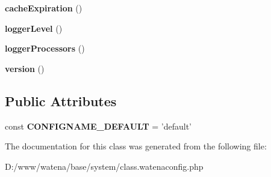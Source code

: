 \begin{DoxyCompactItemize}
\item 
\hypertarget{class_watena_config_ac379b7e4341f2423010cd42e60494518}{{\bfseries cache\-Expiration} ()}\label{class_watena_config_ac379b7e4341f2423010cd42e60494518}

\item 
\hypertarget{class_watena_config_af65f55ea3f405005e08ae63f1853b7a9}{{\bfseries logger\-Level} ()}\label{class_watena_config_af65f55ea3f405005e08ae63f1853b7a9}

\item 
\hypertarget{class_watena_config_a5b7beca01d94377ae27b1317e1e1f192}{{\bfseries logger\-Processors} ()}\label{class_watena_config_a5b7beca01d94377ae27b1317e1e1f192}

\item 
\hypertarget{class_watena_config_a612b0c2f8f3efcf7f79ae28c25379a9b}{{\bfseries version} ()}\label{class_watena_config_a612b0c2f8f3efcf7f79ae28c25379a9b}

\end{DoxyCompactItemize}
\subsection*{Public Attributes}
\begin{DoxyCompactItemize}
\item 
\hypertarget{class_watena_config_a696a8848ec59ae3bbe54fd632620b507}{const {\bfseries C\-O\-N\-F\-I\-G\-N\-A\-M\-E\-\_\-\-D\-E\-F\-A\-U\-L\-T} = 'default'}\label{class_watena_config_a696a8848ec59ae3bbe54fd632620b507}

\end{DoxyCompactItemize}


The documentation for this class was generated from the following file\-:\begin{DoxyCompactItemize}
\item 
D\-:/www/watena/base/system/class.\-watenaconfig.\-php\end{DoxyCompactItemize}
